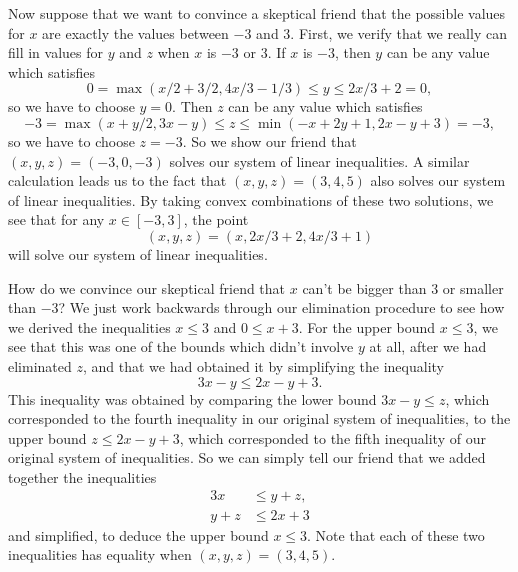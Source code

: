 Now suppose that we want to convince a skeptical friend that the possible values for $x$ are exactly the values between $-3$ and $3$. First, we verify that we really can fill in values for $y$ and $z$ when $x$ is $-3$ or $3$. If $x$ is $-3$, then $y$ can be any value which satisfies
\[
0 = \max(x/2 + 3/2, 4x/3 - 1/3) \le y \le 2x/3 + 2 = 0,
\]
so we have to choose $y = 0$. Then $z$ can be any value which satisfies
\[
-3 = \max(x + y/2, 3x-y) \le z \le \min(-x + 2y + 1, 2x - y + 3) = -3,
\]
so we have to choose $z = -3$. So we show our friend that $(x,y,z) = (-3, 0, -3)$ solves our system of linear inequalities. A similar calculation leads us to the fact that $(x,y,z) = (3, 4, 5)$ also solves our system of linear inequalities. By taking convex combinations of these two solutions, we see that for any $x \in [-3, 3]$, the point
\[
(x,y,z) = (x, 2x/3 + 2, 4x/3 + 1)
\]
will solve our system of linear inequalities.

How do we convince our skeptical friend that $x$ can't be bigger than $3$ or smaller than $-3$? We just work backwards through our elimination procedure to see how we derived the inequalities $x \le 3$ and $0 \le x + 3$. For the upper bound $x \le 3$, we see that this was one of the bounds which didn't involve $y$ at all, after we had eliminated $z$, and that we had obtained it by simplifying the inequality
\[
3x - y \le 2x - y + 3.
\]
This inequality was obtained by comparing the lower bound $3x-y \le z$, which corresponded to the fourth inequality in our original system of inequalities, to the upper bound $z \le 2x - y + 3$, which corresponded to the fifth inequality of our original system of inequalities. So we can simply tell our friend that we added together the inequalities
\begin{align*}
3x &\le y + z,\\
y + z &\le 2x + 3
\end{align*}
and simplified, to deduce the upper bound $x \le 3$. Note that each of these two inequalities has equality when $(x,y,z) = (3,4,5)$.


